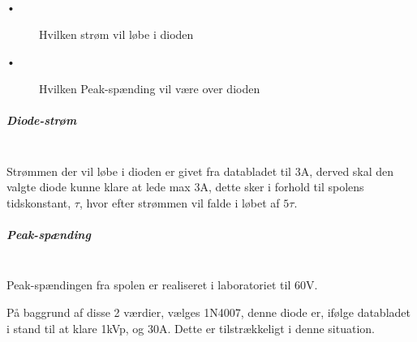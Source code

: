 \begin{description}
 \item[•] Hvilken strøm vil løbe i dioden
 \item[•] Hvilken Peak-spænding vil være over dioden
\end{description}

\subparagraph{Diode-strøm} \hspace{0pt} \\
Strømmen der vil løbe i dioden er givet fra databladet til  3A, derved skal den valgte diode kunne klare at lede max 3A, dette sker i forhold til spolens tidskonstant, $\tau$, hvor efter strømmen vil falde i løbet af $ 5 \tau$.

\subparagraph{Peak-spænding} \hspace{0pt} \\
Peak-spændingen fra spolen er realiseret i laboratoriet til 60V. 

På baggrund af disse 2 værdier, vælges 1N4007, denne diode er, ifølge databladet i stand til at klare 1kVp, og 30A. Dette er tilstrækkeligt i denne situation.
